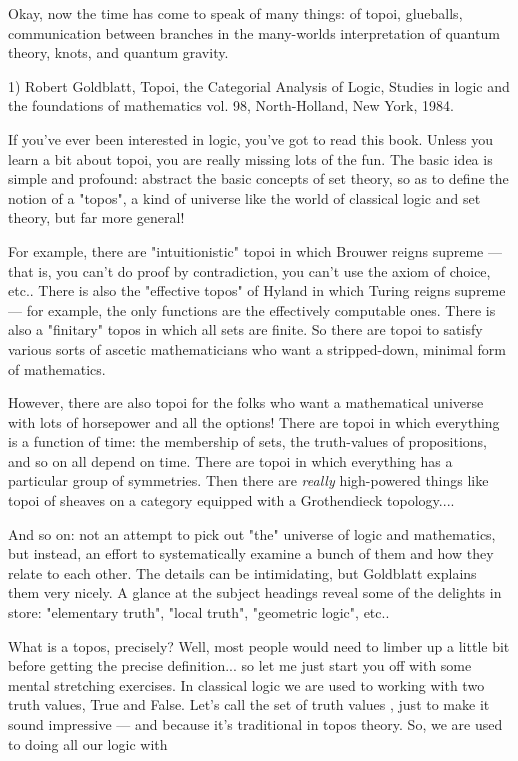 

Okay, now the time has come to speak of many things: of topoi,
glueballs, communication between branches in the many-worlds
interpretation of quantum theory, knots, and quantum gravity.


1) Robert Goldblatt, Topoi, the Categorial Analysis of Logic,
Studies in logic and the foundations of mathematics vol. 98,
North-Holland, New York, 1984.  

If you've ever been interested in logic, you've got to read this book.
Unless you learn a bit about topoi, you are really missing lots of the
fun.  The basic idea is simple and profound: abstract the basic concepts
of set theory, so as to define the notion of a "topos", a kind of
universe like the world of classical logic and set theory, but far more
general!  

For example, there are "intuitionistic" topoi in which Brouwer
reigns supreme --- that is, you can't do proof by contradiction, you
can't use the axiom of choice, etc..  There is also the "effective
topos" of Hyland in which Turing reigns supreme --- for example, the
only functions are the effectively computable ones.  There is also a
"finitary" topos in which all sets are finite.  So there are topoi to
satisfy various sorts of ascetic mathematicians who want a
stripped-down, minimal form of mathematics.  

However, there are also topoi for the folks who want a mathematical
universe with lots of horsepower and all the options!  There are topoi
in which everything is a function of time: the membership of sets, the
truth-values of propositions, and so on all depend on time.  There are
topoi in which everything has a particular group of symmetries.  Then
there are \emph{really} high-powered things like topoi of sheaves on a
category equipped with a Grothendieck topology.... 

And so on: not an attempt to pick out "the" universe of logic and
mathematics, but instead, an effort to systematically examine a bunch of
them and how they relate to each other.  The details can be
intimidating, but Goldblatt explains them very nicely.  A glance at the
subject headings reveal some of the delights in store: "elementary
truth", "local truth", "geometric logic", etc..

What is a topos, precisely?  Well, most people would need to limber up a
little bit before getting the precise definition... so let me just start
you off with some mental stretching exercises.  In classical logic we
are used to working with two truth values, True and False.  Let's call
the set of truth values \Omega , just to make it sound impressive --- and
because it's traditional in topos theory.  So, we are used to doing all
our logic with

